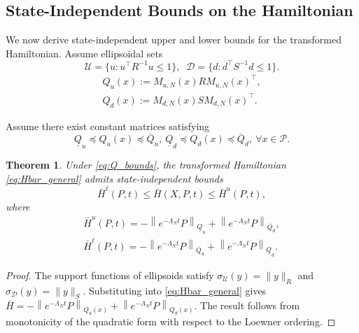 \documentclass[letterpaper, 10 pt, conference]{ieeeconf}
\theoremstyle{plain}
\newtheorem{theorem}{Theorem}
\theoremstyle{definition}
\begin{document}
\subsection{State-Independent Bounds on the Hamiltonian} \label{sec:reachability_bounds}

We now derive state-independent upper and lower bounds
for the transformed Hamiltonian. Assume ellipsoidal sets
\[
\mathcal U
=
\{u:u^\top R^{-1}u\le1\},
\;\;
\mathcal D
=
\{d:d^\top S^{-1}d\le1\}.
\]
\begin{equation}
    \begin{aligned}
            Q_u(x):= M_{u,N}(x)R M_{u,N}(x)^\top,
            \\
            Q_d(x):= M_{d,N}(x)S M_{d,N}(x)^\top.
    \end{aligned}
    \label{eq:QuQd}
\end{equation}

Assume there exist constant matrices satisfying
\begin{equation}
    \underline Q_u
    \preceq
    Q_u(x)
    \preceq
    \overline Q_u,
    \
    \underline Q_d
    \preceq
    Q_d(x)
    \preceq
    \overline Q_d,
    \
    \forall x\in\mathcal P.
    \label{eq:Q_bounds}
\end{equation}

\begin{theorem}
Under \eqref{eq:Q_bounds}, the transformed Hamiltonian
\eqref{eq:Hbar_general} admits state-independent bounds
\[
\bar H^\ell(P,t)
\le
\bar H(X,P,t)
\le
\bar H^u(P,t),
\]
where
\begin{equation}
    \begin{aligned}
        \bar H^u(P,t) = - \left\| e^{-\Lambda_N t}P \right\|_{\underline Q_u} + \left\| e^{-\Lambda_N t}P \right\|_{\overline Q_d},\\
        \bar H^\ell(P,t) = - \left\| e^{-\Lambda_N t}P \right\|_{\overline Q_u} + \left\| e^{-\Lambda_N t}P \right\|_{\underline Q_d}.
    \end{aligned}
\end{equation}

\end{theorem}

\begin{proof}
    The support functions of ellipsoids satisfy
    $\sigma_{\mathcal U}(y) = \|y\|_{R}$ and $\sigma_{\mathcal D}(y) = \|y\|_{S}$.
    Substituting into \eqref{eq:Hbar_general} gives $\bar H = - \left\| e^{-\Lambda_N t}P \right\|_{Q_u(x)} + \left\| e^{-\Lambda_N t}P \right\|_{Q_d(x)}$.
    The result follows from monotonicity of the quadratic form
    with respect to the Loewner ordering.
\end{proof}
\end{document}
